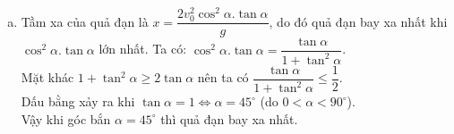 \begin{bt}
{\begin{enumerate}[a)]
\begin{eqnarray*}
				&\Leftrightarrow &\hoac{&\alpha\approx 30^\circ +k180^\circ \\&\alpha\approx 60^\circ +k180^\circ}.
			\end{eqnarray*} Do góc $0<\alpha<90^\circ$ nên ta chọn $\alpha\approx 30^\circ$ hoặc $\alpha\approx 60^\circ$.
			\item Tầm  xa của quả đạn  là $x=\dfrac{2 v_0^2 \cos ^2 \alpha.\tan \alpha}{g}$, do đó quả đạn bay xa nhất khi $ \cos ^2 \alpha.\tan \alpha$ lớn nhất. Ta có: $\cos ^2 \alpha.\tan \alpha =\dfrac{\tan \alpha}{1+\tan^2\alpha}$.\\ Mặt khác $1+\tan^2\alpha \ge 2\tan\alpha$  nên ta có $\dfrac{\tan \alpha}{1+\tan^2\alpha} \le \dfrac{1}{2}$.\\  Dấu bằng xảy ra khi $\tan\alpha =1 \Leftrightarrow \alpha=45^\circ $ (do $0<\alpha<90^\circ$). \\
			Vậy khi góc bắn $\alpha=45^\circ$ thì quả đạn bay xa nhất.
			
	\end{enumerate}}
	
\end{bt}

